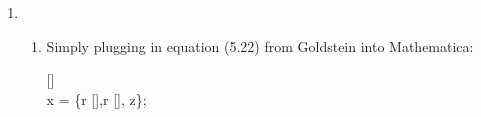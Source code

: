 \documentclass[10pt]{article}
\newcommand{\op}[1]{\pmb{\text{#1}}}
\begin{document}
\begin{enumerate}
\begin{gather*}
\begin{array}{ccc}
            \end{array}
            \right)\\
            \op{A}^{-1}=
            \left(
            \begin{array}{ccc}
                \cos (\psi ) \cos (\phi )-\cos (\theta ) \sin (\psi ) \sin (\phi ) & -\cos (\theta ) \cos (\psi ) \sin (\phi )-\sin (\psi ) \cos (\phi ) & \sin (\theta ) \sin (\phi ) \\
                \cos (\theta ) \sin (\psi ) \cos (\phi )+\cos (\psi ) \sin (\phi ) & \cos (\theta ) \cos (\psi ) \cos (\phi )-\sin (\psi ) \sin (\phi ) & \sin (\theta ) (-\cos (\phi )) \\
                \sin (\theta ) \sin (\psi )                                        & \sin (\theta ) \cos (\psi )                                         & \cos (\theta )                 \\
            \end{array}
            \right)\\
            \omega_{bf}=
            \begin{pmatrix}
                \theta ' \cos (\psi )+\sin (\theta ) \sin (\psi ) \phi ' \\
                \sin (\theta ) \cos (\psi ) \phi '-\theta ' \sin (\psi ) \\
                \cos (\theta ) \phi '+\psi '
            \end{pmatrix}\\
            \op{A}^{-1}\omega_{bf}=
            \begin{pmatrix}
                \theta ' \cos (\phi )+\sin (\theta ) \psi ' \sin (\phi ) \\
                \theta ' \sin (\phi )-\sin (\theta ) \psi ' \cos (\phi ) \\
                \cos (\theta ) \psi '+\phi '
            \end{pmatrix}
        \end{gather*}
        \item
        \begin{enumerate}
            \item Simply plugging in equation (5.22) from Goldstein into Mathematica:\\
            \linebreak
            \parbox{\textwidth}{
                []\\
                x = \{r [\theta ],r [\theta ], z\};\\
}
\end{enumerate}
\end{enumerate}
\end{document}
